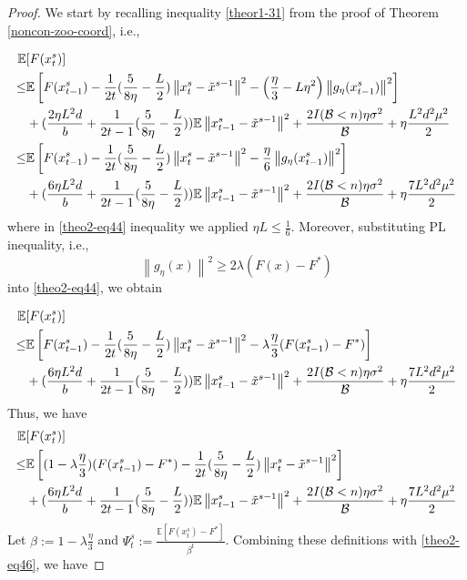 \documentclass[iicol,sn-basic]{sn-jnl}
\theoremstyle{thmstyleone}%
\theoremstyle{thmstyletwo}%
\theoremstyle{thmstylethree}%
\newcommand*{\E}{\mathbb{E}}
\newcommand{\norm}[1]{\left\lVert#1\right\rVert}
\begin{document}
\begin{proof}
We start by recalling inequality \eqref{theor1-31} from the proof of Theorem \ref{noncon-zoo-coord}, i.e.,

\begin{align} 
\E&[F({x}_{t}^s)] \notag
\\ \leq& \E\left[F({x}_{t-1}^s)  -\frac{1}{2t}(\frac{5}{8\eta} - \frac{L}{2})\norm{{x}_t^s-\tilde{x}^{s-1}}^2- \left(\frac{\eta}{3}-L\eta^2\right)\norm{g_{\eta}(x_{t-1}^s)}^2\right]\notag\\
&+(\frac{2\eta L^2 d}{b}+\frac{1}{2t-1}(\frac{5}{8\eta} - \frac{L}{2}))\E\norm{x_{t-1}^s-\tilde{x}^{s-1}}^2
+ \frac{2I(\mathcal{B} < n)\eta \sigma ^2}{\mathcal{B}}+\eta \frac{L^2 d^2 \mu^2}{2}\notag
\\ \leq& \E\left[F({x}_{t-1}^s)  -\frac{1}{2t}(\frac{5}{8\eta} - \frac{L}{2})\norm{{x}_t^s-\tilde{x}^{s-1}}^2- \frac{\eta}{6}\norm{g_{\eta}(x_{t-1}^s)}^2\right]\notag\\
&+(\frac{6\eta L^2 d}{b}+\frac{1}{2t-1}(\frac{5}{8\eta} - \frac{L}{2}))\E\norm{x_{t-1}^s-\tilde{x}^{s-1}}^2
+ \frac{2I(\mathcal{B} < n)\eta \sigma ^2}{\mathcal{B}}+\eta \frac{7 L^2 d^2 \mu^2}{2}\label{theo2-eq44}
 \end{align}
 where in \eqref{theo2-eq44} inequality we applied $\eta L \leq \frac{1}{6}$.
Moreover, substituting PL inequality, i.e., 
\begin{equation}
\norm{g_{\eta}(x)}^2 \geq 2\lambda (F(x) - F^*)
\end{equation}
into \eqref{theo2-eq44}, we obtain

\begin{align} 
\E&[F({x}_{t}^s)] \notag
\\ \leq& \E\left[F({x}_{t-1}^s)  -\frac{1}{2t}(\frac{5}{8\eta} - \frac{L}{2})\norm{{x}_t^s-\tilde{x}^{s-1}}^2- \lambda\frac{\eta}{3}(F({x}_{t-1}^s) - F^*) \right]\notag\\
&+(\frac{6\eta L^2 d}{b}+\frac{1}{2t-1}(\frac{5}{8\eta} - \frac{L}{2}))\E\norm{x_{t-1}^s-\tilde{x}^{s-1}}^2
+ \frac{2I(\mathcal{B} < n)\eta \sigma ^2}{\mathcal{B}}+\eta \frac{7 L^2 d^2 \mu^2}{2}
 \end{align}
Thus, we have
\begin{align} 
\E&[F({x}_{t}^s)] \notag
\\ \leq& \E\left[ (1-\lambda\frac{\eta}{3})(F({x}_{t-1}^s) - F^*)   -\frac{1}{2t}(\frac{5}{8\eta} - \frac{L}{2})\norm{{x}_t^s-\tilde{x}^{s-1}}^2\right]\notag\\
&+(\frac{6 \eta L^2 d}{b}+\frac{1}{2t-1}(\frac{5}{8\eta} - \frac{L}{2}))\E\norm{x_{t-1}^s-\tilde{x}^{s-1}}^2
+ \frac{2I(\mathcal{B} < n)\eta \sigma ^2}{\mathcal{B}}+\eta \frac{7 L^2 d^2 \mu^2}{2}\label{theo2-eq46}
 \end{align}
Let $\beta := 1 - \lambda\frac{\eta}{3}$ and $\Psi_t^s := \frac{\E[F({x}_{t}^s)-F^*]}{\beta^t}$. Combining these definitions with \eqref{theo2-eq46}, we have  


\end{proof}
\end{document}
